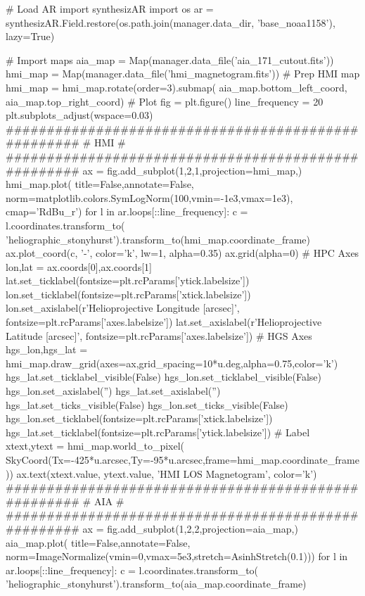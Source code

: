 \begin{pycode}[manager]
# Load AR
import synthesizAR
import os
ar = synthesizAR.Field.restore(os.path.join(manager.data_dir, 'base_noaa1158'), lazy=True)
\end{pycode}
\begin{pycode}[manager]
# Import maps
aia_map = Map(manager.data_file('aia_171_cutout.fits'))
hmi_map = Map(manager.data_file('hmi_magnetogram.fits'))
# Prep HMI map
hmi_map = hmi_map.rotate(order=3).submap(
    aia_map.bottom_left_coord, aia_map.top_right_coord)
# Plot
fig = plt.figure()
line_frequency = 20
plt.subplots_adjust(wspace=0.03)
####################################################
#                       HMI                        #
####################################################
ax = fig.add_subplot(1,2,1,projection=hmi_map,)
hmi_map.plot(
    title=False,annotate=False,
    norm=matplotlib.colors.SymLogNorm(100,vmin=-1e3,vmax=1e3),
    cmap='RdBu_r')
for l in ar.loops[::line_frequency]:
    c = l.coordinates.transform_to(
            'heliographic_stonyhurst').transform_to(hmi_map.coordinate_frame)
    ax.plot_coord(c, '-', color='k', lw=1, alpha=0.35)
ax.grid(alpha=0)
# HPC Axes
lon,lat = ax.coords[0],ax.coords[1]
lat.set_ticklabel(fontsize=plt.rcParams['ytick.labelsize'])
lon.set_ticklabel(fontsize=plt.rcParams['xtick.labelsize'])
lon.set_axislabel(r'Helioprojective Longitude [arcsec]', fontsize=plt.rcParams['axes.labelsize'])
lat.set_axislabel(r'Helioprojective Latitude [arcsec]', fontsize=plt.rcParams['axes.labelsize'])
# HGS Axes
hgs_lon,hgs_lat = hmi_map.draw_grid(axes=ax,grid_spacing=10*u.deg,alpha=0.75,color='k')
hgs_lat.set_ticklabel_visible(False)
hgs_lon.set_ticklabel_visible(False)
hgs_lon.set_axislabel('')
hgs_lat.set_axislabel('')
hgs_lat.set_ticks_visible(False)
hgs_lon.set_ticks_visible(False)
hgs_lon.set_ticklabel(fontsize=plt.rcParams['xtick.labelsize'])
hgs_lat.set_ticklabel(fontsize=plt.rcParams['ytick.labelsize'])
# Label
xtext,ytext = hmi_map.world_to_pixel(
    SkyCoord(Tx=-425*u.arcsec,Ty=-95*u.arcsec,frame=hmi_map.coordinate_frame))
ax.text(xtext.value, ytext.value, 'HMI LOS Magnetogram', color='k')
####################################################
#                       AIA                        #
####################################################
ax = fig.add_subplot(1,2,2,projection=aia_map,)
aia_map.plot(
    title=False,annotate=False,
    norm=ImageNormalize(vmin=0,vmax=5e3,stretch=AsinhStretch(0.1)))
for l in ar.loops[::line_frequency]:
    c = l.coordinates.transform_to(
            'heliographic_stonyhurst').transform_to(aia_map.coordinate_frame)

\end{pycode}
